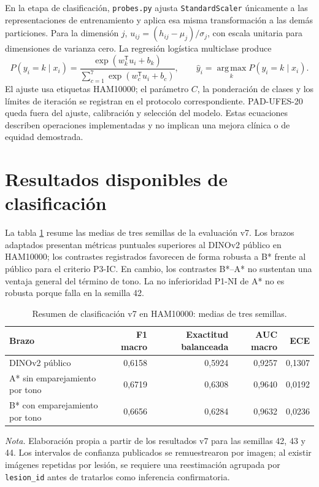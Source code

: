 En la etapa de clasificación, \texttt{probes.py} ajusta \texttt{StandardScaler} únicamente a las representaciones de entrenamiento y aplica esa misma transformación a las demás particiones. Para la dimensión $j$, $u_{ij}=(h_{ij}-\mu_j)/\sigma_j$, con escala unitaria para dimensiones de varianza cero. La regresión logística multiclase produce
\begin{equation}
 P(y_i=k\mid x_i)=\frac{\exp(w_k^{\mathsf T}u_i+b_k)}{\sum_{c=1}^{7}\exp(w_c^{\mathsf T}u_i+b_c)},\qquad
 \widehat y_i=\operatorname*{arg\,max}_{k}P(y_i=k\mid x_i).
\end{equation}
El ajuste usa etiquetas HAM10000; el parámetro $C$, la ponderación de clases y los límites de iteración se registran en el protocolo correspondiente. PAD-UFES-20 queda fuera del ajuste, calibración y selección del modelo. Estas ecuaciones describen operaciones implementadas y no implican una mejora clínica o de equidad demostrada.

\section{Resultados disponibles de clasificación}

La tabla \ref{tab:v7-clasificacion} resume las medias de tres semillas de la evaluación v7. Los brazos adaptados presentan métricas puntuales superiores al DINOv2 público en HAM10000; los contrastes registrados favorecen de forma robusta a B* frente al público para el criterio P3-IC. En cambio, los contrastes B*--A* no sustentan una ventaja general del término de tono. La no inferioridad P1-NI de A* no es robusta porque falla en la semilla 42.

\begin{table}[htbp]
\centering
\caption{Resumen de clasificación v7 en HAM10000: medias de tres semillas.}
\label{tab:v7-clasificacion}
\begin{tabular}{lrrrr}
\toprule
Brazo & F1 macro & Exactitud balanceada & AUC macro & ECE \\
\midrule
DINOv2 público & 0,6158 & 0,5924 & 0,9257 & 0,1307 \\
A* sin emparejamiento por tono & 0,6719 & 0,6308 & 0,9640 & 0,0192 \\
B* con emparejamiento por tono & 0,6656 & 0,6284 & 0,9632 & 0,0236 \\
\bottomrule
\end{tabular}
\end{table}
\noindent\textit{Nota.} Elaboración propia a partir de los resultados v7 para las semillas 42, 43 y 44. Los intervalos de confianza publicados se remuestrearon por imagen; al existir imágenes repetidas por lesión, se requiere una reestimación agrupada por \texttt{lesion\_id} antes de tratarlos como inferencia confirmatoria.

